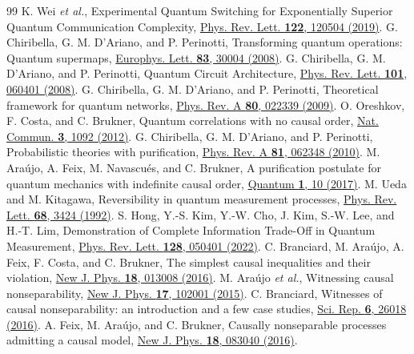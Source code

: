 \documentclass[aps,prl,reprint,superscriptaddress,longbibliography,bibnotes,floatfix]{revtex4-2}
\begin{document}
\begin{thebibliography}{99}
 K. Wei \emph{et al.}, Experimental Quantum Switching for Exponentially Superior Quantum Communication Complexity, \href{https://doi.org/10.1103/PhysRevLett.122.120504}{Phys. Rev. Lett. \textbf{122}, 120504 (2019)}.
 G. Chiribella, G. M. D'Ariano, and P. Perinotti, Transforming quantum operations: Quantum supermaps, \href{https://doi.org/10.1209/0295-5075/83/30004}{Europhys. Lett. \textbf{83}, 30004 (2008)}.
 G. Chiribella, G. M. D'Ariano, and P. Perinotti, Quantum Circuit Architecture, \href{https://doi.org/10.1103/PhysRevLett.101.060401}{Phys. Rev. Lett. \textbf{101}, 060401 (2008)}.
 G. Chiribella, G. M. D'Ariano, and P. Perinotti, Theoretical framework for quantum networks, \href{https://doi.org/10.1103/PhysRevA.80.022339}{Phys. Rev. A \textbf{80}, 022339 (2009)}.
 O. Oreshkov, F. Costa, and C. Brukner, Quantum correlations with no causal order, \href{https://doi.org/10.1038/ncomms2076}{Nat. Commun. \textbf{3}, 1092 (2012)}.
 G. Chiribella, G. M. D'Ariano, and P. Perinotti, Probabilistic theories with purification, \href{https://doi.org/10.1103/PhysRevA.81.062348}{Phys. Rev. A \textbf{81}, 062348 (2010)}.
 M. Ara\'{u}jo, A. Feix, M. Navascu\'{e}s, and C. Brukner, A purification postulate for quantum mechanics with indefinite causal order, \href{https://doi.org/10.22331/q-2017-04-26-10}{Quantum \textbf{1}, 10 (2017)}.
 M. Ueda and M. Kitagawa, Reversibility in quantum measurement processes, \href{https://doi.org/10.1103/PhysRevLett.68.3424}{Phys. Rev. Lett. \textbf{68}, 3424 (1992)}.
 S. Hong, Y.-S. Kim, Y.-W. Cho, J. Kim, S.-W. Lee, and H.-T. Lim, Demonstration of Complete Information Trade-Off in Quantum Measurement, \href{https://doi.org/10.1103/PhysRevLett.128.050401}{Phys. Rev. Lett. \textbf{128}, 050401 (2022)}.
 C. Branciard, M. Ara\'{u}jo, A. Feix, F. Costa, and C. Brukner, The simplest causal inequalities and their violation, \href{https://doi.org/10.1088/1367-2630/18/1/013008}{New J. Phys. \textbf{18}, 013008 (2016)}.
 M. Ara\'{u}jo \emph{et al.}, Witnessing causal nonseparability, \href{https://doi.org/10.1088/1367-2630/17/10/102001}{New J. Phys. \textbf{17}, 102001 (2015)}.
 C. Branciard, Witnesses of causal nonseparability: an introduction and a few case studies, \href{https://doi.org/10.1038/srep26018}{Sci. Rep. \textbf{6}, 26018 (2016)}.
 A. Feix, M. Ara\'{u}jo, and C. Brukner, Causally nonseparable processes admitting a causal model, \href{https://doi.org/10.1088/1367-2630/18/8/083040}{New J. Phys. \textbf{18}, 083040 (2016)}.

\end{thebibliography}
\end{document}

